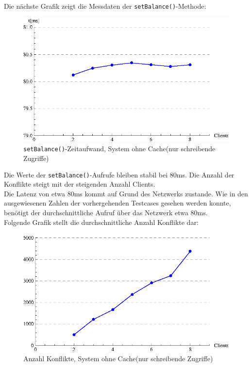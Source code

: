 Die nächste Grafik zeigt die Messdaten der \texttt{setBalance()}-Methode:
\begin{figure}[H]
\begin{center}
\includegraphics[width=\textwidth]{images_MessErgebnisse/incrementRMISetBalance.eps}
\end{center}
\caption{\texttt{setBalance()}-Zeitaufwand, System ohne Cache(nur schreibende Zugriffe)}
\end{figure}

Die Werte der \texttt{setBalance()}-Aufrufe bleiben stabil bei 80ms. Die Anzahl der Konflikte steigt mit der steigenden Anzahl Clients.\\

Die Latenz von etwa 80ms kommt auf Grund des Netzwerks zustande. Wie in den ausgewiesenen Zahlen der vorhergehenden Testcases gesehen werden konnte, benötigt der durchschnittliche Aufruf über das Netzwerk etwa 80ms.\\

Folgende Grafik stellt die durchschnittliche Anzahl Konflikte dar:

\begin{figure}[H]
\begin{center}
\includegraphics[width=\textwidth]{images_MessErgebnisse/incrementRMIKonfliktzahl.eps}
\end{center}
\caption{Anzahl Konflikte, System ohne Cache(nur schreibende Zugriffe)}
\end{figure}

